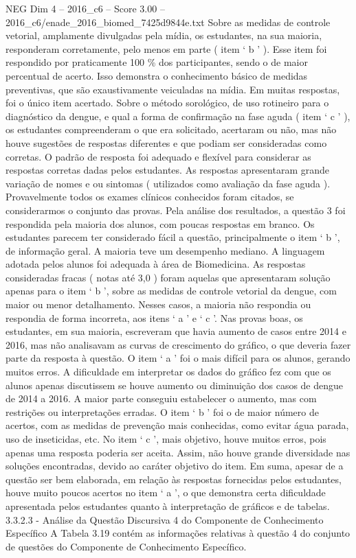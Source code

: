 \begin{textsample}{NEG Dim 4 – 2016\_c6 – Score 3.00 – 2016\_c6/enade\_2016\_biomed\_7425d9844e.txt}
Sobre as medidas de controle vetorial, amplamente divulgadas pela mídia, os estudantes, na sua maioria, responderam corretamente, pelo menos em parte ( item ‘ b ’ ).
Esse item foi respondido por praticamente 100 \% dos participantes, sendo o de maior percentual de acerto.
Isso demonstra o conhecimento básico de medidas preventivas, que são exaustivamente veiculadas na mídia.
Em muitas respostas, foi o único item acertado.
Sobre o método sorológico, de uso rotineiro para o diagnóstico da dengue, e qual a forma de confirmação na fase aguda ( item ‘ c ’ ), os estudantes compreenderam o que era solicitado, acertaram ou não, mas não houve sugestões de respostas diferentes e que podiam ser consideradas como corretas.
O padrão de resposta foi adequado e flexível para considerar as respostas corretas dadas pelos estudantes.
As respostas apresentaram grande variação de nomes e ou sintomas ( utilizados como avaliação da fase aguda ).
Provavelmente todos os exames clínicos conhecidos foram citados, se considerarmos o conjunto das provas.
Pela análise dos resultados, a questão 3 foi respondida pela maioria dos alunos, com poucas respostas em branco.
Os estudantes parecem ter considerado fácil a questão, principalmente o item ‘ b ’, de informação geral.
A maioria teve um desempenho mediano.
A linguagem adotada pelos alunos foi adequada à área de Biomedicina.
As respostas consideradas fracas ( notas até 3,0 ) foram aquelas que apresentaram solução apenas para o item ‘ b ’, sobre as medidas de controle vetorial da dengue, com maior ou menor detalhamento.
Nesses casos, a maioria não respondia ou respondia de forma incorreta, aos itens ‘ a ’ e ‘ c ’.
Nas provas boas, os estudantes, em sua maioria, escreveram que havia aumento de casos entre 2014 e 2016, mas não analisavam as curvas de crescimento do gráfico, o que deveria fazer parte da resposta à questão.
O item ‘ a ’ foi o mais difícil para os alunos, gerando muitos erros.
A dificuldade em interpretar os dados do gráfico fez com que os alunos apenas discutissem se houve aumento ou diminuição dos casos de dengue de 2014 a 2016.
A maior parte conseguiu estabelecer o aumento, mas com restrições ou interpretações erradas.
O item ‘ b ’ foi o de maior número de acertos, com as medidas de prevenção mais conhecidas, como evitar água parada, uso de inseticidas, etc.
No item ‘ c ’, mais objetivo, houve muitos erros, pois apenas uma resposta poderia ser aceita.
Assim, não houve grande diversidade nas soluções encontradas, devido ao caráter objetivo do item.
Em suma, apesar de a questão ser bem elaborada, em relação às respostas fornecidas pelos estudantes, houve muito poucos acertos no item ‘ a ’, o que demonstra certa dificuldade apresentada pelos estudantes quanto à interpretação de gráficos e de tabelas. 3.3.2.3 - Análise da Questão Discursiva 4 do Componente de Conhecimento Específico A Tabela 3.19 contém as informações relativas à questão 4 do conjunto de questões do Componente de Conhecimento Específico.

\end{textsample}
